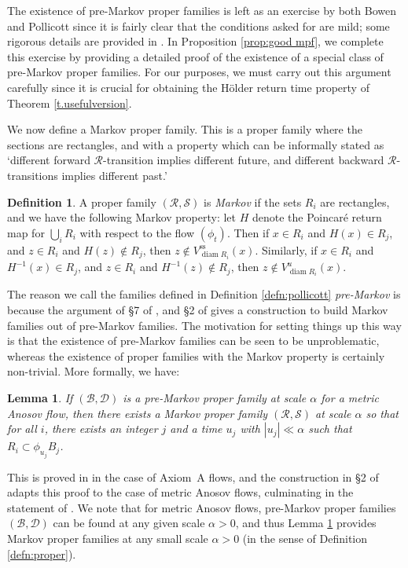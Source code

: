 \documentclass[JEP,XML,SOM,Unicode,NoFloatCountersInSection]{cedram}
\let\mathcal\mathscr
\newcommand{\sts}{\mathrm{ss}}
\newtheorem{lem}[thm]{Lemma}
\theoremstyle{definition}
\newtheorem{defn}[thm]{Definition}
\numberwithin{equation}{section}
\DeclareMathOperator{\diam}{diam}
\newcommand\DDD{\mathcal D}
\newcommand\BBB{\mathcal B}
\newcommand\RRR{\mathcal R}
\newcommand\SSS{\mathcal S}
\begin{document}
The existence of pre-Markov proper families is left as an exercise by both Bowen and Pollicott since it is fairly clear that the conditions asked for are mild; some rigorous details are provided in \cite{BW}. In Proposition \ref{prop:good mpf}, we complete this exercise by providing a detailed proof of the existence of a special class of pre-Markov proper families. For our purposes, we must carry out this argument carefully since it is crucial for obtaining the Hölder return time property of Theorem \ref{t.usefulversion}.

We now define a Markov proper family. This is a proper family where the sections are rectangles, and with a property which can be informally stated as `different forward $\RRR$-transition implies different future, and different backward $\RRR$-transitions implies different past.'

\begin{defn}
A proper family $(\RRR, \SSS)$ is \emph{Markov} if the sets $R_i$ are rectangles, and we have the following Markov property: let $H$ denote the Poincaré return map for $\bigcup_i R_i$ with respect to the flow $(\phi_t)$. Then if $ x \in R_i$ and $ H(x) \in R_j$, and $z \in R_i$ and $H(z) \notin R_j$, then $z \notin V^{\sts}_{\diam R_i}(x)$. Similarly, if $ x \in R_i$ and $ H^{-1}(x) \in R_j$, and $z \in R_i$ and $H^{-1}(z) \notin R_j$, then $z \notin V^u_{\diam R_i}(x)$.
\end{defn}

The reason we call the families defined in Definition \ref{defn:pollicott} \emph{pre-Markov} is because the argument of \S7 of \cite{bowen-symbolic}, and \S2 of \cite{pollicott} gives a construction to build Markov families out of pre-Markov families. The motivation for setting things up this way is that the existence of pre-Markov families can be seen to be unproblematic, whereas the existence of proper families with the Markov property is certainly non-trivial. More formally, we have:

\begin{lem} \label{PtoB}
If $(\BBB, \DDD)$ is a pre-Markov proper family at scale $\alpha$ for a metric Anosov flow, then there exists a Markov proper family $(\RRR, \SSS)$ at scale $\alpha$ so that for all $i$, there exists an integer $j$ and a time $u_j$ with $|u_j|\ll \alpha$ such that $R_i \subset \phi_{u_j}B_j$.
\end{lem}

This is proved in \cite[\S7]{bowen-symbolic} in the case of Axiom~A flows, and the construction in \S2 of \cite{pollicott} adapts this proof to the case of metric Anosov flows, culminating in the statement of \cite[\S 2.2 `Key Lemma']{pollicott}. We note that for metric Anosov flows, pre-Markov proper families $(\BBB, \DDD)$ can be found at any given scale $\alpha>0$, and thus Lemma \ref{PtoB} provides Markov proper families at any small scale $\alpha>0$ (in the sense of Definition \ref{defn:proper}).
\end{document}
